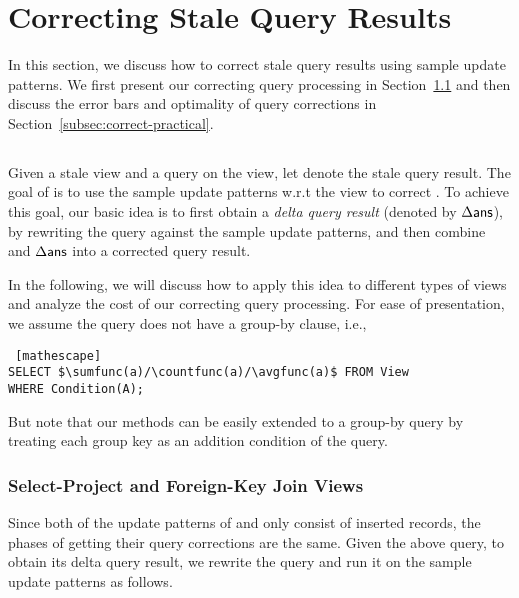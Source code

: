 
\section{Correcting Stale Query Results}
\label{correction}
In this section, we discuss how to correct stale query results using sample update patterns. We first present our correcting query processing in Section~\ref{subsec:correct-principle} and then discuss the error bars and optimality of query corrections in Section~\ref{subsec:correct-practical}.


\subsection{\Cqp}\label{subsec:correct-principle}
Given a stale view and a query on the view, let \ans denote the stale query result. The goal of \cqp is to use the sample update patterns w.r.t the view to correct \ans. To achieve this goal, our basic idea is to first obtain a \emph{delta query result} (denoted by $\Delta\textsf{ans}$), by rewriting the query against the sample update patterns, and then combine \ans and $\Delta\textsf{ans}$ into a corrected query result. 

In the following, we will discuss how to apply this idea to different types of views and analyze the cost of our correcting query processing. For ease of presentation, we assume the query does not have a group-by clause, i.e.,
\begin{lstlisting} [mathescape]
SELECT $\sumfunc(a)/\countfunc(a)/\avgfunc(a)$ FROM View 
WHERE Condition(A);
\end{lstlisting}
But note that our methods can be easily extended to a group-by query by treating each group key as an addition condition of the query. 








\subsubsection{Select-Project and Foreign-Key Join Views} \label{subsubsec:correct-spfj}
Since both of the update patterns of \spview and \fjview only consist of inserted records, the phases of getting their query corrections are the same. Given the above query, to obtain its delta query result, we rewrite the query and run it on the sample update patterns as follows.  

